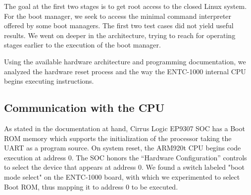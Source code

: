 \documentclass[conference]{IEEEtran}
\newcommand{\nota}[1]{}
\begin{document}
\nota { En los primeros dos casos no se tuvieron resultados promisorios.
La tarea en estos puntos es obtener acceso como administrador del sistema
Linux cerrado. O en el caso del gestor de arranque, se busca
el acceso al interprete de comandos mínimo, que algunos gestores proveen.
Por lo que se continuó a mas bajo nivel, para obtener acceso a niveles
anteriores a la ejecución del gestor de arranque.}

The goal at the first two stages is to get root access to the closed Linux system. For the boot manager, we seek to access the minimal command interpreter offered by some boot managers. The first two test cases did not yield useful results. We went on deeper in the architecture, trying to reach for operating stages earlier to the execution of the boot manager.

\nota {
Leyendo la documentación obtenida de la arquitectura y programación del hardware,
se analizó el proceso de reinicio del hardware y como la CPU interna
del ENTC-1000 comienza a ejecutar instrucciones.
}

Using the available hardware architecture and programming documentation, we analyzed the hardware reset process and the way the ENTC-1000 internal CPU begins executing instructions.

\subsection*{Communication with the CPU}

\nota{El SOC Cirrus EP9307 tiene una ROM de arranque\footnote{boot ROM}.
En un reinicio (en inglés reset) del SOC, la CPU (ARM920t) comienza a ejecutar código en la dirección cero.}

As stated in the documentation at hand, Cirrus Logic EP9307 SOC has a Boot ROM memory which supports the initialization of the processor taking the UART as a program source. On system reset, the ARM920t CPU begins code execution at address 0. The SOC honors the ``Hardware Configuration'' controls to select the device that appears at address 0. We found a switch labeled "boot mode select" on the ENTC-1000 board, with which we experimented to select Boot ROM, thus mapping it to address 0 to be executed.

\nota{Por otro lado, el manual del SOC indica que éste utiliza los controles de la ``configuración del hardware'' para seleccionar qué dispositivo aparece en la dirección ``cero''. Al observar la placa ENTC-1000, se identificó un interruptor etiquetado como ``boot mode select''. Por lo que se procedió a experimentar con el mismo, con el objetivo de seleccionar el BootROM y así mapearlo a la dirección cero, y por ende, lograr su ejecución. }
\end{document}
